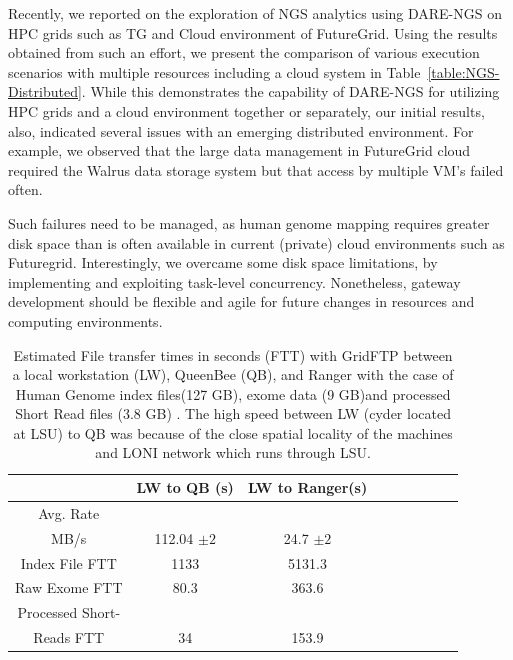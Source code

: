 \documentclass[]{article}
\begin{document}
Recently, we reported on the exploration of NGS analytics using DARE-NGS
on HPC grids such as TG and Cloud environment of
FutureGrid\cite{ecmls11}.  Using the results obtained from such an
effort, we present the comparison of various execution scenarios with
multiple resources including a cloud system in
Table~\ref{table:NGS-Distributed}.  While this demonstrates the
capability of DARE-NGS for utilizing HPC grids and a cloud environment
together or separately, our initial results, also, indicated several
issues with an emerging distributed environment.  For example, we
observed that the large data management in FutureGrid cloud required
the Walrus data storage system but that access by multiple VM's
failed often.  

Such failures need to be managed, as human genome mapping requires
greater disk space than is often available in current (private) cloud
environments such as Futuregrid. Interestingly, we overcame some disk
space limitations, by implementing and exploiting task-level
concurrency. Nonetheless, gateway development should be flexible and
agile for future changes in resources and computing environments.

 \begin{table}
 \small
 \begin{tabular}{|c|c|c|c|c|c|c|c|c|} 
 \hline  
 	          & LW to QB (s)  & LW to Ranger(s) \\
 \hline                       
Avg. Rate && \\
MB/s & 112.04 $\pm 2$ &	    24.7 $\pm 2$  \\
 \hline                       
Index File	FTT & 1133  &	    5131.3      \\        
 \hline                       
Raw 	 Exome FTT&80.3 & 363.6\\                  
 \hline                       
Processed Short-&    & \\
Reads FTT&34&153.9  \\
 \hline                       
                    
\end{tabular}


\caption{Estimated File transfer times in seconds (FTT) with GridFTP between a local workstation (LW), QueenBee (QB), and Ranger with the case of Human Genome index files(127 GB), exome data (9 GB)and processed Short Read files (3.8 GB) . The high speed between LW (cyder located at LSU) to QB was because of the close spatial locality of the machines and LONI network which runs through LSU.   }

 \label{table:NGS-Distributed-file} 
\end{table}
\end{document}
